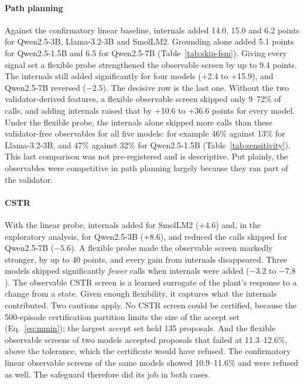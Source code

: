 \paragraph{Path planning} Against the confirmatory linear baseline, internals added 14.0, 15.0 and 6.2 points for
Qwen2.5-3B, Llama-3.2-3B and SmolLM2. Grounding alone added 5.1 points for Qwen2.5-1.5B and 6.5 for Qwen2.5-7B
(Table~\ref{tab:skip-fsm}). Giving every signal set a flexible probe strengthened the observable screen by up to
9.4 points. The internals still added significantly for four models (+2.4 to +15.9), and Qwen2.5-7B reversed
($-2.5$). The decisive row is the last one. Without the two validator-derived features, a flexible observable
screen skipped only 9--72\% of calls, and adding internals raised that by +10.6 to +36.6 points for every model.
Under the flexible probe, the internals alone skipped more calls than these validator-free observables for all
five models: for example 46\% against 13\% for Llama-3.2-3B, and 47\% against 32\% for Qwen2.5-1.5B
(Table~\ref{tab:sensitivity}). This last comparison was not pre-registered and is descriptive. Put plainly, the
observables were competitive in path planning largely because they ran part of the validator.

\paragraph{CSTR} With the linear probe, internals added for SmolLM2 (+4.6) and, in the exploratory analysis, for
Qwen2.5-3B (+8.6), and reduced the calls skipped for Qwen2.5-7B ($-5.6$). A flexible probe made the observable
screen markedly stronger, by up to 40 points, and every gain from internals disappeared. Three models skipped
significantly \emph{fewer} calls when internals were added ($-3.2$ to $-7.8$). The observable CSTR screen is a
learned surrogate of the plant's response to a change from a state. Given enough flexibility, it captures what
the internals contributed. Two cautions apply. No CSTR screen could be certified, because the 500-episode
certification partition limits the size of the accept set (Eq.~\eqref{eq:mmin}); the largest accept set held 135
proposals. And the flexible observable screens of two models accepted proposals that failed at 11.3--12.6\%, above
the tolerance, which the certificate would have refused. The confirmatory linear observable screens of the same
models showed 10.9--11.6\% and were refused as well. The safeguard therefore did its job in both cases.


